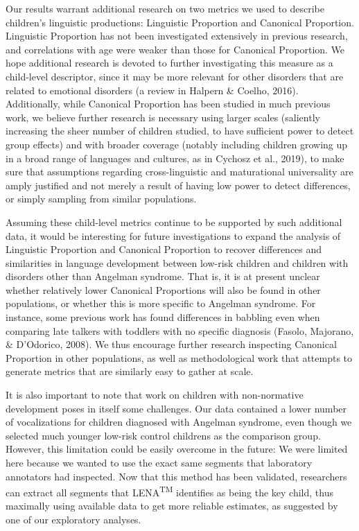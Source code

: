\documentclass[english,,man,floatsintext]{apa6}
\begin{document}
Our results warrant additional research on two metrics we used to describe children's linguistic productions: Linguistic Proportion and Canonical Proportion. Linguistic Proportion has not been investigated extensively in previous research, and correlations with age were weaker than those for Canonical Proportion. We hope additional research is devoted to further investigating this measure as a child-level descriptor, since it may be more relevant for other disorders that are related to emotional disorders (a review in Halpern \& Coelho, 2016). Additionally, while Canonical Proportion has been studied in much previous work, we believe further research is necessary using larger scales (saliently increasing the sheer number of children studied, to have sufficient power to detect group effects) and with broader coverage (notably including children growing up in a broad range of languages and cultures, as in Cychosz et al., 2019), to make sure that assumptions regarding cross-linguistic and maturational universality are amply justified and not merely a result of having low power to detect differences, or simply sampling from similar populations.

Assuming these child-level metrics continue to be supported by such additional data, it would be interesting for future investigations to expand the analysis of Linguistic Proportion and Canonical Proportion to recover differences and similarities in language development between low-risk children and children with disorders other than Angelman syndrome. That is, it is at present unclear whether relatively lower Canonical Proportions will also be found in other populations, or whether this is more specific to Angelman syndrome. For instance, some previous work has found differences in babbling even when comparing late talkers with toddlers with no specific diagnosis (Fasolo, Majorano, \& D'Odorico, 2008). We thus encourage further research inspecting Canonical Proportion in other populations, as well as methodological work that attempts to generate metrics that are similarly easy to gather at scale.

It is also important to note that work on children with non-normative development poses in itself some challenges. Our data contained a lower number of vocalizations for children diagnosed with Angelman syndrome, even though we selected much younger low-risk control childrens as the comparison group. However, this limitation could be easily overcome in the future: We were limited here because we wanted to use the exact same segments that laboratory annotators had inspected. Now that this method has been validated, researchers can extract all segments that LENA\textsuperscript{TM} identifies as being the key child, thus maximally using available data to get more reliable estimates, as suggested by one of our exploratory analyses.
\end{document}

